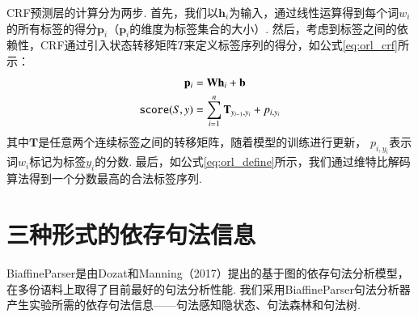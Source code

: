 CRF预测层的计算分为两步. 首先，我们以$\mathbf{h}_i$为输入，通过线性运算得到每个词$w_i$的所有标签的得分$\mathbf{p}_i$（$\mathbf{p}_i$的维度为标签集合的大小）.
然后，考虑到标签之间的依赖性，CRF通过引入状态转移矩阵$T$来定义标签序列的得分，如公式\ref{eq:orl_crf}所示：
%
\begin{equation}\label{eq:orl_crf}
    \setlength{\abovedisplayskip}{9pt}
    \setlength{\belowdisplayskip}{9pt}
    \begin{split}
        \mathbf{p}_i &= \mathbf{W}\mathbf{h}_i+\mathbf{b} \\
        \texttt{score}(S, y) &= \sum_{i=1}^n \mathbf{T}_{y_{i-1}, y_i} + p_{i,y_i}
    \end{split}
\end{equation}
其中$\mathbf{T}$是任意两个连续标签之间的转移矩阵，随着模型的训练进行更新， $p_{i,y_i}$表示词$w_i$标记为标签$y_i$的分数. 最后，如公式\ref{eq:orl_define}所示，我们通过维特比解码算法得到一个分数最高的合法标签序列.


%



%

\section{三种形式的依存句法信息}
BiaffineParser是由Dozat和Manning（2017）提出的基于图的依存句法分析模型，在多份语料上取得了目前最好的句法分析性能.
我们采用BiaffineParser句法分析器产生实验所需的依存句法信息——句法感知隐状态、句法森林和句法树.

